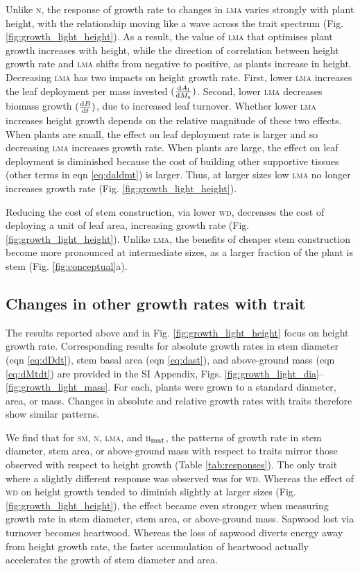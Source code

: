 \documentclass[9pt,twocolumn,twoside,lineno]{pnas-new}
\newcommand{\lma}{\textsc{lma}}
\newcommand{\wood}{\textsc{wd}}
\newcommand{\seed}{\textsc{sm}}
\newcommand{\hmat}{\textsc{h}$_{\rm mat}$}
\newcommand{\nitrogen}{\textsc{n}}
\begin{document}
Unlike {\nitrogen}, the response of growth rate to changes in {\lma} varies strongly with plant height, with the relationship moving like a wave across the trait spectrum (Fig. \ref{fig:growth_light_height}). As a result, the value of {\lma} that optimises plant growth increases with height, while the direction of correlation between height growth rate and {\lma} shifts from negative to positive, as plants increase in height. Decreasing {\lma} has two impacts on height growth rate. First, lower {\lma} increases the leaf deployment per mass invested $(\frac{{\rm d}A_{\rm l}}{{\rm d}M_{\rm a}})$. Second, lower {\lma} decreases biomass growth $(\frac{{\rm d}B}{{\rm d}t})$, due to increased leaf turnover. Whether lower {\lma} increases height growth depends on the relative magnitude of these two effects. When plants are small, the effect on leaf deployment rate is larger and so decreasing {\lma} increases growth rate. When plants are large, the effect on leaf deployment is diminished because the cost of building other supportive tissues (other terms in eqn \ref{eq:daldmt}) is larger. Thus, at larger sizes low {\lma} no longer increases growth rate (Fig. \ref{fig:growth_light_height}).

Reducing the cost of stem construction, via lower {\wood}, decreases the cost of deploying a unit of leaf area, increasing growth rate (Fig. \ref{fig:growth_light_height}). Unlike {\lma}, the benefits of cheaper stem construction become more pronounced at intermediate sizes, as a larger fraction of the plant is stem (Fig. \ref{fig:conceptual}a).

\subsection*{Changes in other growth rates with trait}

The results reported above and in Fig. \ref{fig:growth_light_height} focus on height growth rate. Corresponding results for absolute growth rates in stem diameter (eqn \ref{eq:dDdt}), stem basal area (eqn \ref{eq:dast}), and above-ground mass (eqn \ref{eq:dMtdt}) are provided in the SI Appendix, Figs. \ref{fig:growth_light_dia}--\ref{fig:growth_light_mass}. For each, plants were grown to a standard diameter, area, or mass. Changes in absolute and relative growth rates with traits therefore show similar patterns.

We find that for {\seed}, {\nitrogen}, {\lma}, and {\hmat}, the patterns of growth rate in stem diameter, stem area, or above-ground mass with respect to traits mirror those observed with respect to height growth (Table \ref{tab:responses}). The only trait where a slightly different response was observed was for {\wood}. Whereas the effect of {\wood} on height growth tended to diminish slightly at larger sizes (Fig. \ref{fig:growth_light_height}), the effect became even stronger when measuring growth rate in stem diameter, stem area, or above-ground mass. Sapwood lost via turnover becomes heartwood. Whereas the loss of sapwood diverts energy away from height growth rate, the faster accumulation of heartwood actually accelerates the growth of stem diameter and area.
\end{document}
